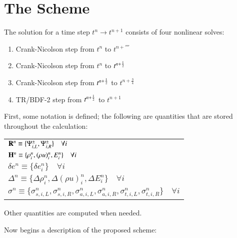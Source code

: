 \section{The Scheme}

The solution for a time step $t^n\rightarrow t^{n+1}$ consists of four
nonlinear solves:

\begin{enumerate}
  \item Crank-Nicolson step from $t^n$ to $t^{n+\fourth}$
  \item Crank-Nicolson step from $t^n$ to $t^{n+\frac{1}{2}}$
  \item Crank-Nicolson step from $t^{n+\frac{1}{2}}$ to $t^{n+\frac{3}{4}}$
  \item TR/BDF-2 step from $t^{n+\frac{1}{2}}$ to $t^{n+1}$
\end{enumerate}

First, some notation is defined; the following are quantities that are stored
throughout the calculation:
\begin{center}
\begin{tabular}{l}
   $\mathbf{R}^n \equiv \{\Psi^\pm_{i,L},\Psi^\pm_{i,R}\} \quad\forall i$ \\
   $\mathbf{H}^n \equiv \{\rho_i^n, (\rho u)_i^n, E_i^n\} \quad\forall i$ \\
   $\delta e^n \equiv \{\delta e_i^n\} \quad\forall i$ \\
   $\Delta^n \equiv \{\Delta\rho_i^n, \Delta(\rho u)_i^n, \Delta E_i^n\} \quad\forall i$ \\
   $\sigma^n \equiv \{\sigma_{s,i,L}^n, \sigma_{s,i,R}^n,
   \sigma_{a,i,L}^n, \sigma_{a,i,R}^n, \sigma_{t,i,L}^n, \sigma_{t,i,R}^n\}
   \quad\forall i$
\end{tabular}
\end{center}
Other quantities are computed when needed.

Now begins a description of the proposed scheme:

